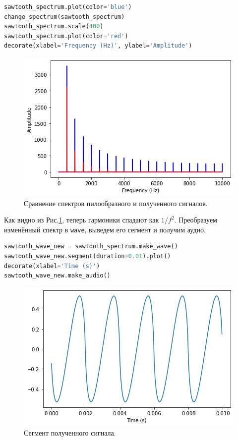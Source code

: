 \documentclass[a4paper, 14pt]{extarticle}
\begin{document}
    \begin{lstlisting}[language=Python, caption= Изменение спада гармоник и сравнение спектров., label={lst:task6_change_and_compare_spectrum}]
sawtooth_spectrum.plot(color='blue')
change_spectrum(sawtooth_spectrum)
sawtooth_spectrum.scale(400)
sawtooth_spectrum.plot(color='red')
decorate(xlabel='Frequency (Hz)', ylabel='Amplitude')
    \end{lstlisting}

    \begin{figure}[h]
        \centering
        \includegraphics[width=0.8\linewidth]{resources/Images/task6_compare_spectrum}
        \caption{Сравнение спектров пилообразного и полученного сигналов.}
        \label{fig:task6_compare_spectrum}
    \end{figure}

    Как видно из Рис.\ref{fig:task6_compare_spectrum}, теперь гармоники спадают как $1/f^2$.
    Преобразуем изменённый спектр в \texttt{wave}, выведем его сегмент и получим аудио.

    \begin{lstlisting}[language=Python, caption= Получение аудио и \texttt{wave}., label={lst:task6_wave_and_audio}]
sawtooth_wave_new = sawtooth_spectrum.make_wave()
sawtooth_wave_new.segment(duration=0.01).plot()
decorate(xlabel='Time (s)')
sawtooth_wave_new.make_audio()
    \end{lstlisting}

    \begin{figure}[H]
        \centering
        \includegraphics[width=0.8\linewidth]{resources/Images/task6_signal_wave}
        \caption{Сегмент полученного сигнала.}
        \label{fig:task6_signal_wave}
    \end{figure}
\end{document}
